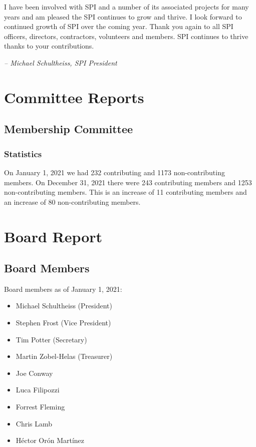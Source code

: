 \documentclass[a4paper]{report}
\begin{document}
I have been involved with SPI and a number of its associated projects
for many years and am pleased the SPI continues to grow and thrive.
I look forward to continued growth of SPI over the coming year.  Thank
you again to all SPI officers, directors, contractors, volunteers and
members. SPI continues to thrive thanks to your contributions.

  \emph{-- Michael Schultheiss, SPI President}

\chapter{Committee Reports}
\section{Membership Committee}

\subsection{Statistics}

On January 1, 2021 we had 232 contributing and 1173 non-contributing members.  On December 31, 2021 there were 243 contributing members and 1253 non-contributing members.  This is an increase of 11 contributing members and an increase of 80 non-contributing members.

\chapter{Board Report}
\section{Board Members}

Board members as of January 1, 2021:

\begin{itemize}
\item Michael Schultheiss (President)
\item Stephen Frost (Vice President)
\item Tim Potter (Secretary)
\item Martin Zobel-Helas (Treasurer)
\item Joe Conway
\item Luca Filipozzi
\item Forrest Fleming
\item Chris Lamb
\item Héctor Orón Martínez
\end{itemize}
\end{document}
